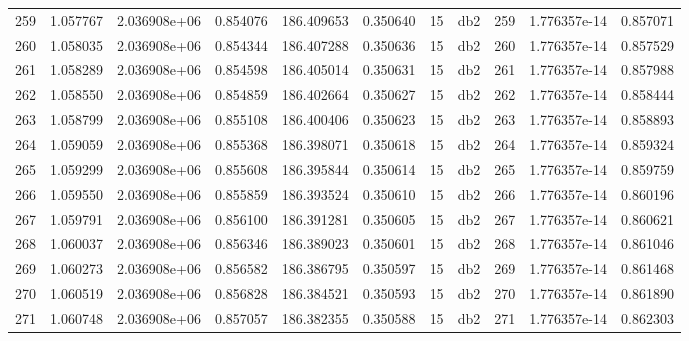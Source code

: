 \begin{tabular}{lrrrrrrlrrr}
259  &    1.057767 &        2.036908e+06 &  0.854076 &              186.409653 &    0.350640 &      15 &          db2 &    259 &   1.776357e-14 &      0.857071 \\
260  &    1.058035 &        2.036908e+06 &  0.854344 &              186.407288 &    0.350636 &      15 &          db2 &    260 &   1.776357e-14 &      0.857529 \\
261  &    1.058289 &        2.036908e+06 &  0.854598 &              186.405014 &    0.350631 &      15 &          db2 &    261 &   1.776357e-14 &      0.857988 \\
262  &    1.058550 &        2.036908e+06 &  0.854859 &              186.402664 &    0.350627 &      15 &          db2 &    262 &   1.776357e-14 &      0.858444 \\
263  &    1.058799 &        2.036908e+06 &  0.855108 &              186.400406 &    0.350623 &      15 &          db2 &    263 &   1.776357e-14 &      0.858893 \\
264  &    1.059059 &        2.036908e+06 &  0.855368 &              186.398071 &    0.350618 &      15 &          db2 &    264 &   1.776357e-14 &      0.859324 \\
265  &    1.059299 &        2.036908e+06 &  0.855608 &              186.395844 &    0.350614 &      15 &          db2 &    265 &   1.776357e-14 &      0.859759 \\
266  &    1.059550 &        2.036908e+06 &  0.855859 &              186.393524 &    0.350610 &      15 &          db2 &    266 &   1.776357e-14 &      0.860196 \\
267  &    1.059791 &        2.036908e+06 &  0.856100 &              186.391281 &    0.350605 &      15 &          db2 &    267 &   1.776357e-14 &      0.860621 \\
268  &    1.060037 &        2.036908e+06 &  0.856346 &              186.389023 &    0.350601 &      15 &          db2 &    268 &   1.776357e-14 &      0.861046 \\
269  &    1.060273 &        2.036908e+06 &  0.856582 &              186.386795 &    0.350597 &      15 &          db2 &    269 &   1.776357e-14 &      0.861468 \\
270  &    1.060519 &        2.036908e+06 &  0.856828 &              186.384521 &    0.350593 &      15 &          db2 &    270 &   1.776357e-14 &      0.861890 \\
271  &    1.060748 &        2.036908e+06 &  0.857057 &              186.382355 &    0.350588 &      15 &          db2 &    271 &   1.776357e-14 &      0.862303 \\

\end{tabular}
